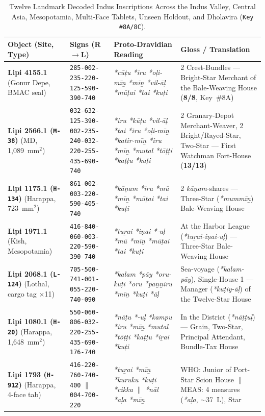 \documentclass[11pt,a4paper]{article}
\begin{document}
\begin{table}[htbp]
\centering
\caption{Twelve Landmark Decoded Indus Inscriptions Across the Indus Valley, Central Asia, Mesopotamia, Multi-Face Tablets, Unseen Holdout, and Dholavira (\texttt{Key \#8A/8C}).}
\label{tab:inscriptions}
\scriptsize
\begin{tabularx}{\textwidth}{@{}L{2.7cm}L{3.2cm}L{4.0cm}Y@{}}
\toprule
Object (Site, Type) & Signs (R$\to$L) & Proto-Dravidian Reading & Gloss / Translation \\
\midrule
\textbf{Lipi 4155.1} (Gonur Depe, BMAC seal) & \texttt{285-002-235-220-}\allowbreak\texttt{125-590-390-740} & \textit{*cūṭu *iru *oḷi-mīṉ *mīṉ *vil-āḷ *mūṭai *tai *kuṭi} & 2 Crest-Bundles — Bright-Star Merchant of the Bale-Weaving House (\textbf{8/8}, Key~\#8A) \\
\textbf{Lipi 2566.1 (\texttt{M-38})} (MD, 1,089~mm$^2$) & \texttt{032-632-125-390-}\allowbreak\texttt{002-235-240-032-}\allowbreak\texttt{220-255-435-690-740} & \textit{*iru *kūṭu *vil-āḷ *tai *iru *oḷi-mīṉ *katir-mīṉ *iru *mīṉ *mutal *tōṭṭi *kaṭṭu *kuṭi} & 2 Granary-Depot Merchant-Weaver, 2 Bright/Rayed-Star, Two-Star — First Watchman Fort-House (\textbf{13/13}) \\
\textbf{Lipi 1175.1 (\texttt{H-134})} (Harappa, 723~mm$^2$) & \texttt{861-002-003-220-}\allowbreak\texttt{590-405-740} & \textit{*kāṇam *iru *mū *mīṉ *mūṭai *tai *kuṭi} & 2 \textit{kāṇam}-shares — Three-Star (\textit{*mummīṉ}) Bale-Weaving House \\
\textbf{Lipi 1971.1} (Kish, Mesopotamia) & \texttt{416-840-060-003-}\allowbreak\texttt{220-590-390-740} & \textit{*tuṟai *iṇai *-uḷ *mū *mīṉ *mūṭai *tai *kuṭi} & At the Harbor League (\textit{*tuṟai-iṇai-uḷ}) — Three-Star Bale-Weaving House \\
\textbf{Lipi 2068.1 (\texttt{L-124})} (Lothal, cargo tag $\times$11) & \texttt{705-500-741-001-}\allowbreak\texttt{055-220-740-090} & \textit{*kalam *pāy *oru-kuṭi *oru *paṉṉiru *mīṉ *kuṭi *āḷ} & Sea-voyage (\textit{*kalam-pāy}), Single-House 1 — Manager (\textit{*kuṭiy-āḷ}) of the Twelve-Star House \\
\textbf{Lipi 1080.1 (\texttt{H-20})} (Harappa, 1,648~mm$^2$) & \texttt{550-060-806-032-}\allowbreak\texttt{220-255-435-690-}\allowbreak\texttt{176-740} & \textit{*nāṭu *-uḷ *kampu *iru *mīṉ *mutal *tōṭṭi *kaṭṭu *iṟai *kuṭi} & In the District (\textit{*nāṭṭuḷ}) — Grain, Two-Star, Principal Attendant, Bundle-Tax House \\
\textbf{Lipi 1793 (\texttt{H-912})} (Harappa, 4-face tab) & \texttt{416-220-760-740-400} $\parallel$ \texttt{004-700-220} & \textit{*tuṟai *mīṉ *kuruku *kuṭi *cikka} $\parallel$ \textit{*nāl *aḷa *mīṉ} & WHO: Junior of Port-Star Scion House $\parallel$ MEAS: 4 measures (\textit{*aḷa}, $\sim$37~L), Star \\

\end{tabularx}
\end{table}
\end{document}
